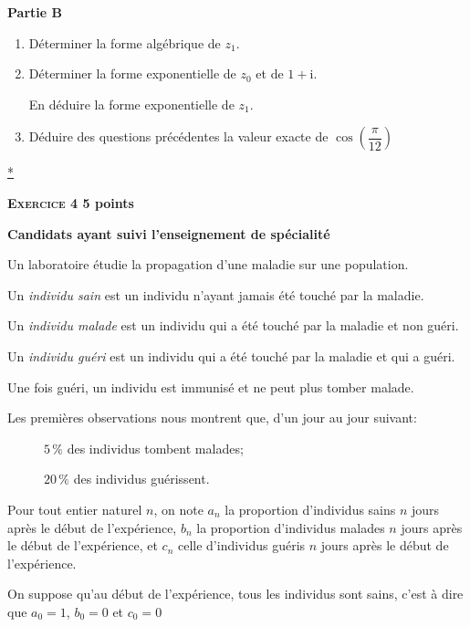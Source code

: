\documentclass[10pt]{article}
\begin{document}
\textbf{Partie B}

\medskip

\begin{enumerate}
\item Déterminer la forme algébrique de $z_1$.
\item Déterminer la forme exponentielle de $z_0$ et de $1+\mathrm{i}$.

En déduire la forme exponentielle de $z_1$.
\item Déduire des questions précédentes la valeur exacte de $\cos\left(\dfrac{\pi}{12}\right)$
\end{enumerate}\hyperlink{Index}{*}
\newpage

\textbf{\textsc{Exercice 4} \hfill 5 points}
\medskip

\textbf{Candidats ayant  suivi l'enseignement de spécialité}
\medskip

Un laboratoire étudie la propagation d'une maladie sur une population.

Un \emph{individu sain} est un individu n'ayant jamais été touché par la maladie.

Un \emph{individu malade} est un individu qui a été  touché par la maladie et non guéri.

Un \emph{individu guéri} est un individu qui a été  touché par la maladie et qui a guéri.

Une fois guéri, un individu est immunisé et ne peut plus tomber malade.

Les premières observations nous montrent  que, d'un jour au jour suivant:

\begin{description}
\item[\textbullet] $5\,\%$ des individus tombent malades;
\item[\textbullet] $20\,\%$ des individus guérissent.
\end{description}

Pour tout entier naturel $n$, on note $a_n$ la proportion d'individus sains $n$ jours après le début de l'expérience, $b_n$ la proportion d'individus malades $n$ jours après le début de l'expérience, et $c_n$ celle d'individus guéris $n$ jours après le début de l'expérience.

On suppose qu'au début de l'expérience, tous les individus sont sains, c'est à dire que $a_0=1$, $b_0 = 0$ et $c_0 = 0$

\medskip
\end{document}
